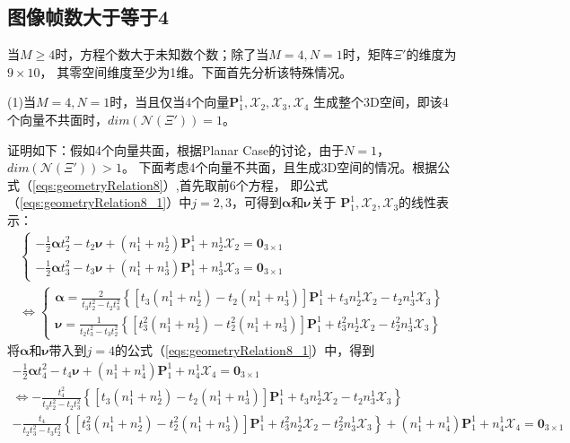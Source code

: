 \documentclass{article}
\begin{document}
\subsection{图像帧数大于等于4}
当$M\geqslant 4$时，方程个数大于未知数个数；除了当$M=4,N=1$时，矩阵$\Xi'$的维度为$9\times 10$，
其零空间维度至少为1维。下面首先分析该特殊情况。
\par
(1)当$M=4,N=1$时，当且仅当4个向量$\textbf{P}_1^1,\mathcal{X}_2,\mathcal{X}_3,\mathcal{X}_4$
生成整个3D空间，即该4个向量不共面时，$dim(\mathcal{N}(\Xi'))=1$。
\par
证明如下：假如4个向量共面，根据Planar Case的讨论，由于$N=1$，$dim(\mathcal{N}(\Xi'))>1$。
下面考虑4个向量不共面，且生成3D空间的情况。根据公式（\ref{eqs:geometryRelation8}）,首先取前6个方程，
即公式（\ref{eqs:geometryRelation8_1}）中$j=2,3$，可得到$\mathbf{\alpha}$和$\mathbf{\nu}$关于
$\textbf{P}_1^1,\mathcal{X}_2,\mathcal{X}_3$的线性表示：
\begin{equation}\label{eqs:j23}
    \begin{array}{c}
    \left\{\begin{array}{c}
        -\frac{1}{2}\mathbf{\alpha}t_2^2-t_2\mathbf{\nu}+(n_1^1+n_2^1)\textbf{P}_1^1+n_2^1\mathcal{X}_2=\textbf{0}_{3\times 1}\\
        -\frac{1}{2}\mathbf{\alpha}t_3^2-t_3\mathbf{\nu}+(n_1^1+n_3^1)\textbf{P}_1^1+n_3^1\mathcal{X}_3=\textbf{0}_{3\times 1}
    \end{array}\right.\\
    \Leftrightarrow
    \left\{
    \begin{array}{c}
        \mathbf{\alpha}=\frac{2}{t_{3}t_2^2-t_{2}t_3^2}
        \left\{\left[t_{3}(n_1^1+n_2^1)-t_{2}(n_1^1+n_3^1)\right]\textbf{P}_1^1
        +t_{3}n_2^1\mathcal{X}_2-t_{2}n_3^1\mathcal{X}_3\right\}\\
        \mathbf{\nu}=\frac{1}{t_{2}t_3^2-t_{3}t_2^2}
        \left\{\left[t_{3}^{2}(n_1^1+n_2^1)-t_{2}^{2}(n_1^1+n_3^1)\right]\textbf{P}_1^1
        +t_{3}^{2}n_2^1\mathcal{X}_2-t_{2}^{2}n_3^1\mathcal{X}_3\right\}
    \end{array}\right.
    \end{array}
\end{equation}
将$\mathbf{\alpha}$和$\mathbf{\nu}$带入到$j=4$的公式（\ref{eqs:geometryRelation8_1}）中，得到
\begin{equation}\label{eqs:j234}
    \begin{array}{c}
        -\frac{1}{2}\mathbf{\alpha}t_4^2-t_4\mathbf{\nu}+(n_1^1+n_4^1)\textbf{P}_1^1+n_4^1\mathcal{X}_4=\textbf{0}_{3\times 1}\\
        \Leftrightarrow
        -\frac{t_4^2}{t_{3}t_2^2-t_{2}t_3^2}
        \left\{\left[t_{3}(n_1^1+n_2^1)-t_{2}(n_1^1+n_3^1)\right]\textbf{P}_1^1
        +t_{3}n_2^1\mathcal{X}_2-t_{2}n_3^1\mathcal{X}_3\right\}\\
        -\frac{t_4}{t_{2}t_3^2-t_{3}t_2^2}
        \left\{\left[t_{3}^{2}(n_1^1+n_2^1)-t_{2}^{2}(n_1^1+n_3^1)\right]\textbf{P}_1^1
        +t_{3}^{2}n_2^1\mathcal{X}_2-t_{2}^{2}n_3^1\mathcal{X}_3\right\}
        +(n_1^1+n_4^1)\textbf{P}_1^1+n_4^1\mathcal{X}_4=\textbf{0}_{3\times 1}
    \end{array}
\end{equation}
\end{document}
